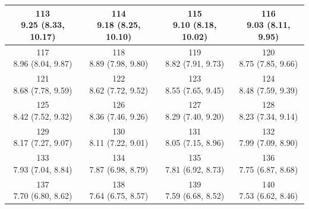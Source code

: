 \begin{table}[htbp]
\begin{tabular}{cccc}
\hline
\shortstack[c]{113\\9.25 (8.33, 10.17)} & \shortstack[c]{114\\9.18 (8.25, 10.10)} & \shortstack[c]{115\\9.10 (8.18, 10.02)} & \shortstack[c]{116\\9.03 (8.11, 9.95)} \\
\hline
\shortstack[c]{117\\8.96 (8.04, 9.87)} & \shortstack[c]{118\\8.89 (7.98, 9.80)} & \shortstack[c]{119\\8.82 (7.91, 9.73)} & \shortstack[c]{120\\8.75 (7.85, 9.66)} \\
\hline
\shortstack[c]{121\\8.68 (7.78, 9.59)} & \shortstack[c]{122\\8.62 (7.72, 9.52)} & \shortstack[c]{123\\8.55 (7.65, 9.45)} & \shortstack[c]{124\\8.48 (7.59, 9.39)} \\
\hline
\shortstack[c]{125\\8.42 (7.52, 9.32)} & \shortstack[c]{126\\8.36 (7.46, 9.26)} & \shortstack[c]{127\\8.29 (7.40, 9.20)} & \shortstack[c]{128\\8.23 (7.34, 9.14)} \\
\hline
\shortstack[c]{129\\8.17 (7.27, 9.07)} & \shortstack[c]{130\\8.11 (7.22, 9.01)} & \shortstack[c]{131\\8.05 (7.15, 8.96)} & \shortstack[c]{132\\7.99 (7.09, 8.90)} \\
\hline
\shortstack[c]{133\\7.93 (7.04, 8.84)} & \shortstack[c]{134\\7.87 (6.98, 8.79)} & \shortstack[c]{135\\7.81 (6.92, 8.73)} & \shortstack[c]{136\\7.75 (6.87, 8.68)} \\
\hline
\shortstack[c]{137\\7.70 (6.80, 8.62)} & \shortstack[c]{138\\7.64 (6.75, 8.57)} & \shortstack[c]{139\\7.59 (6.68, 8.52)} & \shortstack[c]{140\\7.53 (6.62, 8.46)} \\

\end{tabular}
\end{table}
